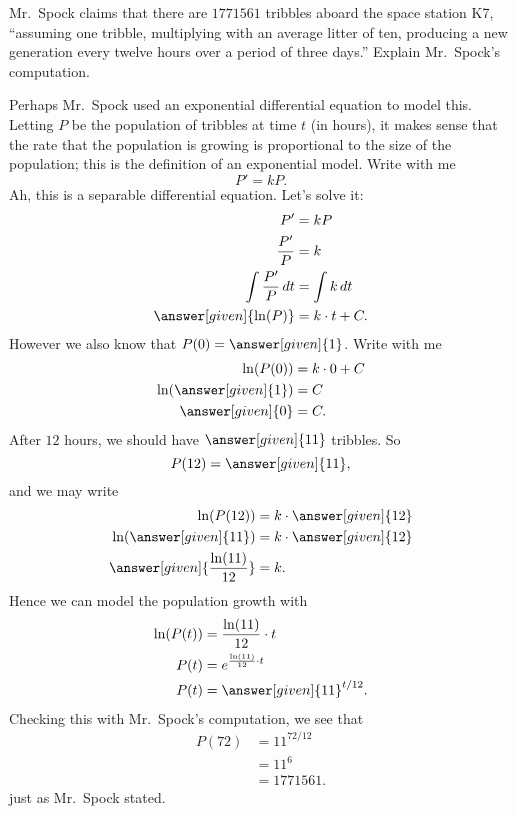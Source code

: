 \documentclass{ximera}
\begin{document}
\begin{example}
  Mr.\ Spock claims that there are $1771561$ tribbles aboard the space
  station K7, ``assuming one tribble, multiplying with an average
  litter of ten, producing a new generation every twelve hours over a
  period of three days.'' Explain Mr.\ Spock's computation.
  \begin{explanation}
    Perhaps Mr.\ Spock used an exponential differential equation to
    model this.  Letting $P$ be the population of tribbles at time $t$
    (in hours), it makes sense that the rate that the population is
    growing is proportional to the size of the population; this is the
    definition of an exponential model. Write with me
    \[
    P' = k P.
    \]
    Ah, this is a separable differential equation. Let's solve it:
    \begin{align*}
      P' &= k P\\
      \frac{P'}{P} &= k\\
      \int \frac{P'}{P} \d t &= \int k\d t\\
      \answer[given]{\ln(P)} &= k\cdot t + C.
    \end{align*}
    However we also know that $P(0) = \answer[given]{1}$. Write with me
    \begin{align*}
      \ln(P(0)) &= k\cdot 0 + C\\
      \ln(\answer[given]{1}) &= C\\
      \answer[given]{0} &=C.
    \end{align*}
    After $12$ hours, we should have $\answer[given]{11}$ tribbles. So 
    \[
    P(12) = \answer[given]{11},
    \]
    and we may write
    \begin{align*}
      \ln(P(12)) &= k\cdot \answer[given]{12}\\
    \ln(\answer[given]{11}) &= k\cdot \answer[given]{12}\\
    \answer[given]{\frac{\ln(11)}{12}} &= k.
    \end{align*}
    Hence we can model the population growth with
    \begin{align*}
      \ln(P(t)) &= \frac{\ln(11)}{12}\cdot t\\
      P(t) &= e^{\frac{\ln(11)}{12} \cdot t}\\
      P(t) &= \answer[given]{11}^{t/12}.
    \end{align*}
    Checking this with Mr.\ Spock's computation, we see that
    \begin{align*}
      P(72) &= 11^{72/12}\\
      &= 11^6\\
      &=1771561.
    \end{align*}
    just as Mr.\ Spock stated.
  \end{explanation}
\end{example}
\end{document}
